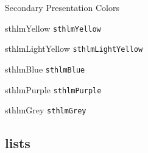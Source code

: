 \documentclass[compress]{beamer}
\begin{document}
\begin{frame}{Secondary Presentation Colors}
\begin{multicols}{2}
\begin{beamercolorbox}[wd=\linewidth,ht=2ex,dp=0.7ex]{sthlmYellow}
	\texttt{sthlmYellow}
\end{beamercolorbox}

\begin{beamercolorbox}[wd=\linewidth,ht=2ex,dp=0.7ex]{sthlmLightYellow}
	\texttt{sthlmLightYellow}
\end{beamercolorbox}

\begin{beamercolorbox}[wd=\linewidth,ht=2ex,dp=0.7ex]{sthlmBlue}
	\texttt{sthlmBlue}
\end{beamercolorbox}

\begin{beamercolorbox}[wd=\linewidth,ht=2ex,dp=0.7ex]{sthlmPurple}
	\texttt{sthlmPurple}
\end{beamercolorbox}

\begin{beamercolorbox}[wd=\linewidth,ht=2ex,dp=0.7ex]{sthlmGrey}
	\texttt{sthlmGrey}
\end{beamercolorbox}

\end{multicols}
\end{frame}

\subsection{lists}

\end{document}
